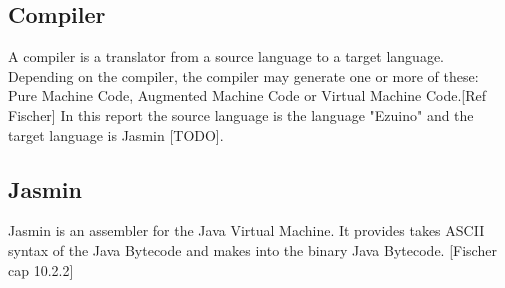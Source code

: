 \subsection{Compiler}
A compiler is a translator from a source language to a target language.
Depending on the compiler, the compiler may generate one or more of these: Pure Machine Code, Augmented Machine Code or Virtual Machine Code.[Ref Fischer]
In this report the source language is the language "Ezuino" and the target language is Jasmin [TODO].

\subsection{Jasmin}
Jasmin is an assembler for the Java Virtual Machine. It provides takes ASCII syntax of the Java Bytecode and makes into the binary Java Bytecode. [Fischer cap 10.2.2]
